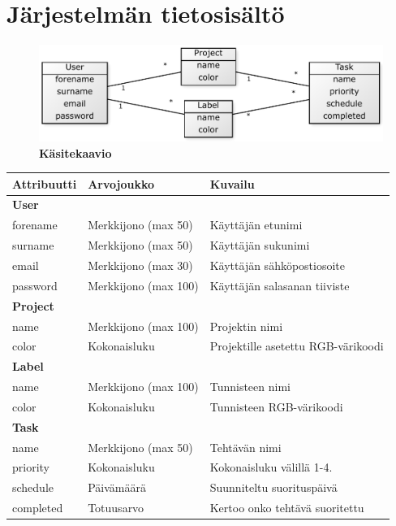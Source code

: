 \documentclass[12pt,a4paper,oneside,titlepage,pdftex]{article}
\begin{document}
\section{Järjestelmän tietosisältö}

\begin{figure}[htbp]
\begin{center}
\includegraphics[width=\textwidth]{img/kasitekaavio.pdf}
\caption{{\bf Käsitekaavio}}
\label{kasitekaavio}
\end{center}
\end{figure}


\renewcommand{\arraystretch}{1.2}
\begin{tabularx}{\textwidth}{llX}
\toprule
Attribuutti & Arvojoukko & Kuvailu \\
\midrule
\multicolumn{3}{l}{\bf User} \\
forename    & Merkkijono (max 50)  & Käyttäjän etunimi      \\ 
surname     & Merkkijono (max 50)  & Käyttäjän sukunimi    \\ 
email         & Merkkijono (max 30)  & Käyttäjän sähköpostiosoite   \\ 
password    & Merkkijono (max 100) & Käyttäjän salasanan tiiviste \\[2pt]
\midrule
\multicolumn{3}{l}{\bf Project} \\
name    & Merkkijono (max 100) & Projektin nimi \\
color     & Kokonaisluku            & Projektille asetettu RGB\hyp{}värikoodi \\[2pt]
\midrule
\multicolumn{3}{l}{\bf Label} \\
name    & Merkkijono (max 100) & Tunnisteen nimi \\
color     & Kokonaisluku            & Tunnisteen RGB\hyp{}värikoodi \\[2pt]
\midrule
\multicolumn{3}{l}{\bf Task} \\
name         & Merkkijono (max 50)  & Tehtävän nimi      \\ 
priority      & Kokonaisluku            & Kokonaisluku välillä 1-4.    \\ 
schedule     & Päivämäärä              & Suunniteltu suorituspäivä   \\ 
completed   & Totuusarvo              & Kertoo onko tehtävä suoritettu \\
\bottomrule
\end{tabularx}
\end{document}
